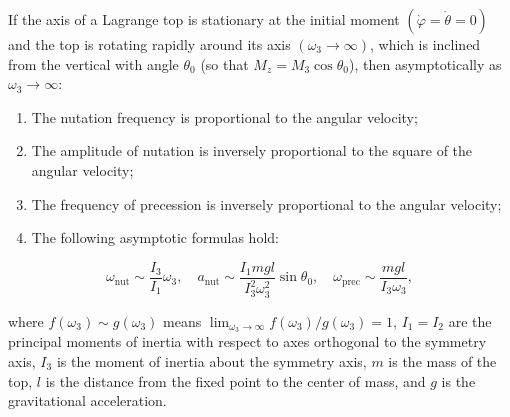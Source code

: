 If the axis of a Lagrange top is stationary at the initial moment $(\dot{\varphi} = \dot{\theta} = 0)$ and the top is rotating rapidly around its axis $(\omega_3 \to \infty)$, which is inclined from the vertical with angle $\theta_0$ (so that $M_z = M_3 \cos \theta_0$), then asymptotically as $\omega_3 \to \infty$:

\begin{enumerate}
\item The nutation frequency is proportional to the angular velocity;
\item The amplitude of nutation is inversely proportional to the square of the angular velocity;
\item The frequency of precession is inversely proportional to the angular velocity;
\item The following asymptotic formulas hold:
\end{enumerate}

$$\omega_{\text{nut}} \sim \frac{I_3}{I_1} \omega_3, \quad a_{\text{nut}} \sim \frac{I_1 m g l}{I_3^2 \omega_3^2} \sin \theta_0, \quad \omega_{\text{prec}} \sim \frac{m g l}{I_3 \omega_3},$$

where $f(\omega_3) \sim g(\omega_3)$ means $\lim_{\omega_3 \to \infty} f(\omega_3)/g(\omega_3) = 1$, $I_1 = I_2$ are the principal moments of inertia with respect to axes orthogonal to the symmetry axis, $I_3$ is the moment of inertia about the symmetry axis, $m$ is the mass of the top, $l$ is the distance from the fixed point to the center of mass, and $g$ is the gravitational acceleration.
